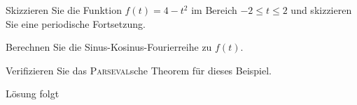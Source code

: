 \documentclass{atistandalonetask}
\begin{document}
  \begin{atiTask}[
    title = Periodische Fortsetzung
  ]


	\begin{atiSubtasks}
		\item Skizzieren Sie die Funktion $f(t)=4-t^2$ im Bereich $-2\leq t\leq 2$ und skizzieren Sie eine periodische Fortsetzung.
		\item Berechnen Sie die Sinus-Kosinus-Fourierreihe zu $f(t)$.
		\item Verifizieren Sie das \textsc{Parseval}sche Theorem für dieses Beispiel.
	\end{atiSubtasks} 
	\atiNote{\[\sum _{n=1}^\infty\frac{1}{n^4}=\frac{\pi^4}{90}\]}
  \end{atiTask}
  \begin{atiSolution}
  Lösung folgt
  \end{atiSolution}
\end{document}
